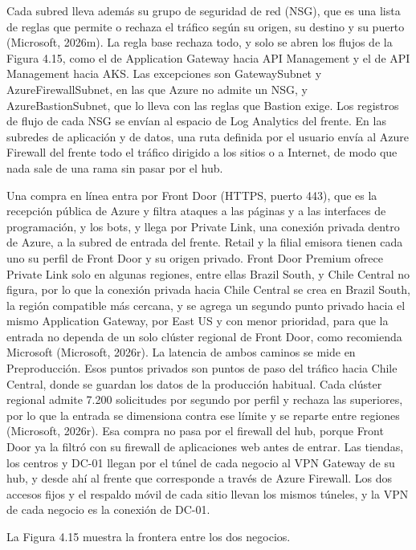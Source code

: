 \documentclass[11pt]{article}
\begin{document}
Cada subred lleva además su grupo de seguridad de red (NSG), que es una lista de reglas que permite o rechaza el tráfico según su origen, su destino y su puerto (Microsoft, 2026m). La regla base rechaza todo, y solo se abren los flujos de la Figura 4.15, como el de Application Gateway hacia API Management y el de API Management hacia AKS. Las excepciones son GatewaySubnet y AzureFirewallSubnet, en las que Azure no admite un NSG, y AzureBastionSubnet, que lo lleva con las reglas que Bastion exige. Los registros de flujo de cada NSG se envían al espacio de Log Analytics del frente. En las subredes de aplicación y de datos, una ruta definida por el usuario envía al Azure Firewall del frente todo el tráfico dirigido a los sitios o a Internet, de modo que nada sale de una rama sin pasar por el hub.

Una compra en línea entra por Front Door (HTTPS, puerto 443), que es la recepción pública de Azure y filtra ataques a las páginas y a las interfaces de programación, y los bots, y llega por Private Link, una conexión privada dentro de Azure, a la subred de entrada del frente. Retail y la filial emisora tienen cada uno su perfil de Front Door y su origen privado. Front Door Premium ofrece Private Link solo en algunas regiones, entre ellas Brazil South, y Chile Central no figura, por lo que la conexión privada hacia Chile Central se crea en Brazil South, la región compatible más cercana, y se agrega un segundo punto privado hacia el mismo Application Gateway, por East US y con menor prioridad, para que la entrada no dependa de un solo clúster regional de Front Door, como recomienda Microsoft (Microsoft, 2026r). La latencia de ambos caminos se mide en Preproducción. Esos puntos privados son puntos de paso del tráfico hacia Chile Central, donde se guardan los datos de la producción habitual. Cada clúster regional admite 7.200 solicitudes por segundo por perfil y rechaza las superiores, por lo que la entrada se dimensiona contra ese límite y se reparte entre regiones (Microsoft, 2026r). Esa compra no pasa por el firewall del hub, porque Front Door ya la filtró con su firewall de aplicaciones web antes de entrar. Las tiendas, los centros y DC-01 llegan por el túnel de cada negocio al VPN Gateway de su hub, y desde ahí al frente que corresponde a través de Azure Firewall. Los dos accesos fijos y el respaldo móvil de cada sitio llevan los mismos túneles, y la VPN de cada negocio es la conexión de DC-01.

La Figura 4.15 muestra la frontera entre los dos negocios.
\end{document}
